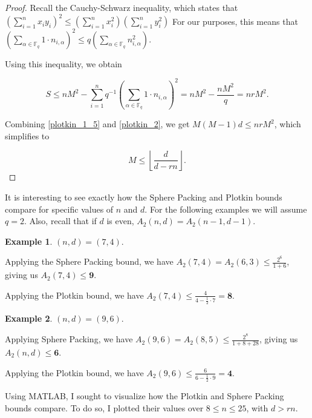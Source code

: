 \documentclass{article}
\numberwithin{theorem}{subsection}
\numberwithin{lemma}{subsection}
\theoremstyle{definition}
\newtheorem{exmp}{Example}
\numberwithin{exmp}{subsection}
\theoremstyle{definition}
\numberwithin{defn}{subsection}
\theoremstyle{definition}
\numberwithin{claim}{subsection}
\begin{document}
\begin{proof}
Recall the Cauchy-Schwarz inequality, which states that $\left(\sum_{i=1}^n x_i y_i \right )^2 \le \left(\sum_{i=1}^n x_i^2 \right ) \left(\sum_{i=1}^n y_i^2 \right )$
For our purposes, this means that $\left(\sum_{\alpha\in\mathbb{F}_q} 1\cdot n_{i,\alpha} \right )^2 \le q \left(\sum_{\alpha\in\mathbb{F}_q} n_{i,\alpha}^2 \right )$.

Using this inequality, we obtain

\begin{equation} \label{plotkin_2}
S \le nM^2 - \sum_{i=1}^n q^{-1} \left(\sum_{\alpha\in\mathbb{F}_q} 1\cdot n_{i,\alpha} \right )^2 = nM^2 - \frac{nM^2}{q} = nrM^2.
\end{equation}

Combining \ref{plotkin_1_5} and \ref{plotkin_2}, we get $M(M-1)d \le nrM^2$, which simplifies to 

\begin{equation}
M \le \left\lfloor \frac{d}{d-rn} \right\rfloor.
\end{equation}

\end{proof}

It is interesting to see exactly how the Sphere Packing and Plotkin bounds compare for specific values of $n$ and $d$.  For the following examples we will assume $q=2$.    
Also, recall that if $d$ is even, $A_2(n,d) = A_2(n-1,d-1)$.  

\begin{exmp}
$(n,d) = (7,4)$.

Applying the Sphere Packing bound, we have $A_2(7,4) = A_2(6,3) \le \frac{2^6}{1 + 6}$, 
giving us $A_2(7,4) \le \textbf{9}$.

Applying the Plotkin bound, we have $A_2(7,4) \le \frac{4}{4-\frac{1}{2}\cdot7} = \textbf{8}$.

\end{exmp}

\begin{exmp}
$(n,d) = (9,6)$.

Applying Sphere Packing, we have  $A_2(9,6) = A_2(8,5) \le \frac{2^8}{1+8+28}$, giving us $A_2(n,d) \le \textbf{6}$.

Applying the Plotkin bound, we have $A_2(9,6) \le \frac{6}{6-\frac{1}{2}\cdot9} = \textbf{4}$.
\end{exmp}

Using MATLAB, I sought to visualize how the Plotkin and Sphere Packing bounds compare.  To do so, I plotted their values over $8\le n \le 25$, with $d>rn$.
\end{document}
